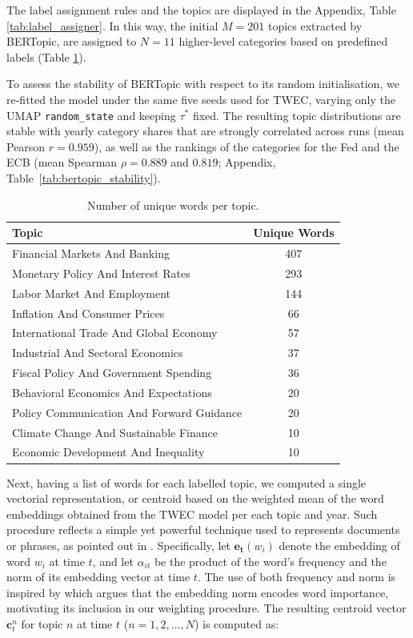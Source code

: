 The label assignment rules and the topics are displayed in the Appendix, Table \ref{tab:label_assigner}. In this way, the initial $M=201$ topics extracted by BERTopic, are assigned to $N=11$ higher-level categories based on predefined labels (Table \ref{tab:unique_words}).

To assess the stability of BERTopic with respect to its random initialisation, we re-fitted the model under the same five seeds used for TWEC, varying only the UMAP \texttt{random\_state} and keeping $\tau^*$ fixed. The resulting topic distributions are stable with yearly category shares that are strongly correlated across runs (mean Pearson $r = 0.959$), as well as the rankings of the categories for the Fed and the ECB (mean Spearman $\rho = 0.889$ and $0.819$; Appendix, Table~\ref{tab:bertopic_stability}).

\begin{table}[h!]
    \centering
    \caption{Number of unique words per topic.}
    \label{tab:unique_words}
    \begin{tabular}{l c}
        \hline
        \textbf{Topic} & \textbf{Unique Words} \\
        \hline
        Financial Markets And Banking & 407 \\
        Monetary Policy And Interest Rates & 293 \\
        Labor Market And Employment & 144 \\
        Inflation And Consumer Prices & 66 \\
        International Trade And Global Economy & 57 \\
        Industrial And Sectoral Economics & 37 \\
        Fiscal Policy And Government Spending & 36 \\
        Behavioral Economics And Expectations & 20 \\
        Policy Communication And Forward Guidance & 20 \\
        Climate Change And Sustainable Finance & 10 \\
        Economic Development And Inequality & 10 \\
        \hline
    \end{tabular}
\end{table}

Next, having a list of words for each labelled topic, we computed a single vectorial representation, or centroid based on the weighted mean of the word embeddings obtained from the TWEC model per each topic and year. Such procedure reflects a simple yet powerful technique used to represents documents or phrases, as pointed out in \cite{zhang2024word}. Specifically, let $\mathbf{e_t}(w_i)$ denote the embedding of word $w_i$ at time $t$, and let $\alpha_{it}$ be the product of the word's frequency and the norm of its embedding vector at time $t$. The use of both frequency and norm is inspired by \cite{oyama2023norm} which argues that the embedding norm encodes word importance, motivating its inclusion in our weighting procedure. The resulting centroid vector $\mathbf{c}_t^n$ for topic $n$ at time $t$ ($n=1,2,\dots,N$) is computed as:

